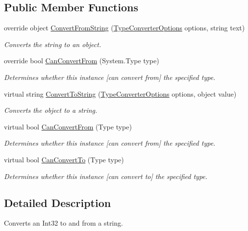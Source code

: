 \subsection*{Public Member Functions}
\begin{DoxyCompactItemize}
\item 
override object \hyperlink{a00095_a392314cc9b5f5b4ad176d0f1a99af32f}{Convert\-From\-String} (\hyperlink{a00152}{Type\-Converter\-Options} options, string text)
\begin{DoxyCompactList}\small\item\em Converts the string to an object. \end{DoxyCompactList}\item 
override bool \hyperlink{a00095_ad5fc1d8a5eb73fb4588e7cdc66bd2d89}{Can\-Convert\-From} (System.\-Type type)
\begin{DoxyCompactList}\small\item\em Determines whether this instance \mbox{[}can convert from\mbox{]} the specified type. \end{DoxyCompactList}\item 
virtual string \hyperlink{a00066_a36cb2f9b24f15a671293f3a722324c27}{Convert\-To\-String} (\hyperlink{a00152}{Type\-Converter\-Options} options, object value)
\begin{DoxyCompactList}\small\item\em Converts the object to a string. \end{DoxyCompactList}\item 
virtual bool \hyperlink{a00066_a470d21adaa704eb281250dbd112ff91a}{Can\-Convert\-From} (Type type)
\begin{DoxyCompactList}\small\item\em Determines whether this instance \mbox{[}can convert from\mbox{]} the specified type. \end{DoxyCompactList}\item 
virtual bool \hyperlink{a00066_acb65bd8c8199d88d5b1629ae35d18514}{Can\-Convert\-To} (Type type)
\begin{DoxyCompactList}\small\item\em Determines whether this instance \mbox{[}can convert to\mbox{]} the specified type. \end{DoxyCompactList}\end{DoxyCompactItemize}


\subsection{Detailed Description}
Converts an Int32 to and from a string. 



